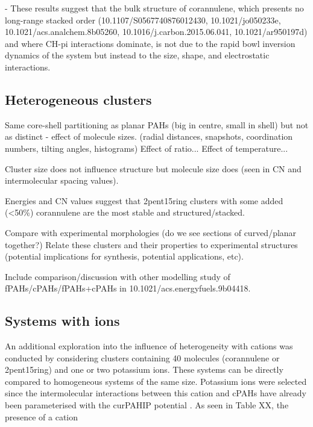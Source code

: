 - These results suggest that the bulk structure of corannulene, which presents no long-range stacked order (10.1107/S0567740876012430, 10.1021/jo050233e, 10.1021/acs.analchem.8b05260, 10.1016/j.carbon.2015.06.041, 10.1021/ar950197d) and where CH-pi interactions dominate, is not due to the rapid bowl inversion dynamics of the system but instead to the size, shape, and electrostatic interactions.

\subsection{Heterogeneous clusters}
Same core-shell partitioning as planar PAHs (big in centre, small in shell) but not as distinct - effect of molecule sizes. (radial distances, snapshots, coordination numbers, tilting angles, histograms)
Effect of ratio...
Effect of temperature...

Cluster size does not influence structure but molecule size does (seen in CN and intermolecular spacing values).

Energies and CN values suggest that 2pent15ring clusters with some added (<50\%) corannulene are the most stable and structured/stacked.

Compare with experimental morphologies (do we see sections of curved/planar together?)
Relate these clusters and their properties to experimental structures (potential implications for synthesis, potential applications, etc).

Include comparison/discussion with other modelling study of fPAHs/cPAHs/fPAHs+cPAHs in 10.1021/acs.energyfuels.9b04418.


\subsection{Systems with ions}
An additional exploration into the influence of heterogeneity with cations was conducted by considering clusters containing 40 molecules (corannulene or 2pent15ring) and one or two potassium ions.  These systems can be directly compared to homogeneous systems of the same size.  Potassium ions were selected since the intermolecular interactions between this cation and cPAHs have already been parameterised with the curPAHIP potential \cite{bowal2019ion}. As seen in Table XX, the presence of a cation

